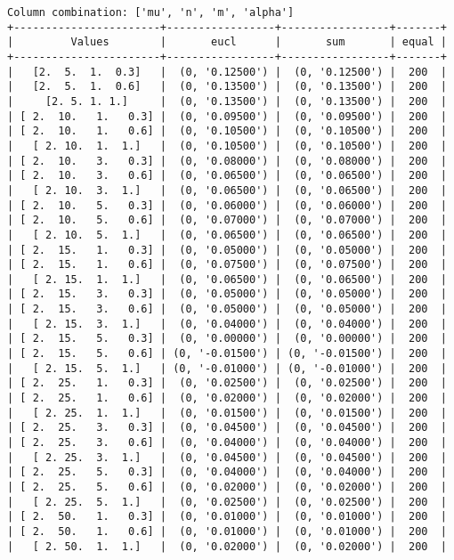 \documentclass{article}
\begin{document}
\begin{verbatim}
Column combination: ['mu', 'n', 'm', 'alpha']
+-----------------------+-----------------+-----------------+-------+
|         Values        |       eucl      |       sum       | equal |
+-----------------------+-----------------+-----------------+-------+
|   [2.  5.  1.  0.3]   |  (0, '0.12500') |  (0, '0.12500') |  200  |
|   [2.  5.  1.  0.6]   |  (0, '0.13500') |  (0, '0.13500') |  200  |
|     [2. 5. 1. 1.]     |  (0, '0.13500') |  (0, '0.13500') |  200  |
| [ 2.  10.   1.   0.3] |  (0, '0.09500') |  (0, '0.09500') |  200  |
| [ 2.  10.   1.   0.6] |  (0, '0.10500') |  (0, '0.10500') |  200  |
|   [ 2. 10.  1.  1.]   |  (0, '0.10500') |  (0, '0.10500') |  200  |
| [ 2.  10.   3.   0.3] |  (0, '0.08000') |  (0, '0.08000') |  200  |
| [ 2.  10.   3.   0.6] |  (0, '0.06500') |  (0, '0.06500') |  200  |
|   [ 2. 10.  3.  1.]   |  (0, '0.06500') |  (0, '0.06500') |  200  |
| [ 2.  10.   5.   0.3] |  (0, '0.06000') |  (0, '0.06000') |  200  |
| [ 2.  10.   5.   0.6] |  (0, '0.07000') |  (0, '0.07000') |  200  |
|   [ 2. 10.  5.  1.]   |  (0, '0.06500') |  (0, '0.06500') |  200  |
| [ 2.  15.   1.   0.3] |  (0, '0.05000') |  (0, '0.05000') |  200  |
| [ 2.  15.   1.   0.6] |  (0, '0.07500') |  (0, '0.07500') |  200  |
|   [ 2. 15.  1.  1.]   |  (0, '0.06500') |  (0, '0.06500') |  200  |
| [ 2.  15.   3.   0.3] |  (0, '0.05000') |  (0, '0.05000') |  200  |
| [ 2.  15.   3.   0.6] |  (0, '0.05000') |  (0, '0.05000') |  200  |
|   [ 2. 15.  3.  1.]   |  (0, '0.04000') |  (0, '0.04000') |  200  |
| [ 2.  15.   5.   0.3] |  (0, '0.00000') |  (0, '0.00000') |  200  |
| [ 2.  15.   5.   0.6] | (0, '-0.01500') | (0, '-0.01500') |  200  |
|   [ 2. 15.  5.  1.]   | (0, '-0.01000') | (0, '-0.01000') |  200  |
| [ 2.  25.   1.   0.3] |  (0, '0.02500') |  (0, '0.02500') |  200  |
| [ 2.  25.   1.   0.6] |  (0, '0.02000') |  (0, '0.02000') |  200  |
|   [ 2. 25.  1.  1.]   |  (0, '0.01500') |  (0, '0.01500') |  200  |
| [ 2.  25.   3.   0.3] |  (0, '0.04500') |  (0, '0.04500') |  200  |
| [ 2.  25.   3.   0.6] |  (0, '0.04000') |  (0, '0.04000') |  200  |
|   [ 2. 25.  3.  1.]   |  (0, '0.04500') |  (0, '0.04500') |  200  |
| [ 2.  25.   5.   0.3] |  (0, '0.04000') |  (0, '0.04000') |  200  |
| [ 2.  25.   5.   0.6] |  (0, '0.02000') |  (0, '0.02000') |  200  |
|   [ 2. 25.  5.  1.]   |  (0, '0.02500') |  (0, '0.02500') |  200  |
| [ 2.  50.   1.   0.3] |  (0, '0.01000') |  (0, '0.01000') |  200  |
| [ 2.  50.   1.   0.6] |  (0, '0.01000') |  (0, '0.01000') |  200  |
|   [ 2. 50.  1.  1.]   |  (0, '0.02000') |  (0, '0.02000') |  200  |

\end{verbatim}
\end{document}
